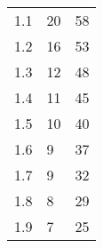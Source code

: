 \begin{table}[H]
{\begin{tabular}{|l|l|l|}
1.1                      & 20                                                                                                                  & 58                                                                                                                 \\
1.2                      & 16                                                                                                                  & 53                                                                                                                 \\
1.3                      & 12                                                                                                                  & 48                                                                                                                 \\
1.4                      & 11                                                                                                                  & 45                                                                                                                 \\
1.5                      & 10                                                                                                                  & 40                                                                                                                 \\
1.6                      & 9                                                                                                                   & 37                                                                                                                 \\
1.7                      & 9                                                                                                                   & 32                                                                                                                 \\
1.8                      & 8                                                                                                                   & 29                                                                                                                 \\
1.9                      & 7                                                                                                                   & 25                                                                                                                 \\

\end{tabular}}
\end{table}
